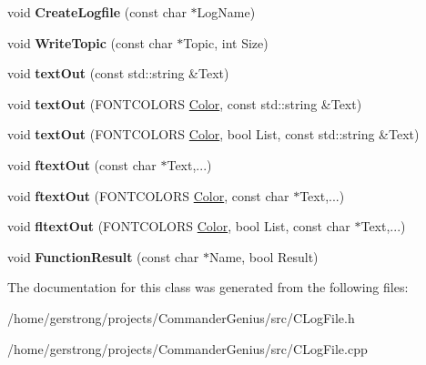 \begin{DoxyCompactItemize}
\item 
\hypertarget{class_c_log_file_a7a16cbbe6c76e8f862d506bf84c742c3}{
void {\bfseries CreateLogfile} (const char $\ast$LogName)}
\label{class_c_log_file_a7a16cbbe6c76e8f862d506bf84c742c3}

\item 
\hypertarget{class_c_log_file_a33046a6467f02fbc1219432d4c70e57d}{
void {\bfseries WriteTopic} (const char $\ast$Topic, int Size)}
\label{class_c_log_file_a33046a6467f02fbc1219432d4c70e57d}

\item 
\hypertarget{class_c_log_file_a1517a34e2c4a3cc99077101e77bd2266}{
void {\bfseries textOut} (const std::string \&Text)}
\label{class_c_log_file_a1517a34e2c4a3cc99077101e77bd2266}

\item 
\hypertarget{class_c_log_file_a56721cf83c549f35a9d7335836fa395c}{
void {\bfseries textOut} (FONTCOLORS \hyperlink{struct_color}{Color}, const std::string \&Text)}
\label{class_c_log_file_a56721cf83c549f35a9d7335836fa395c}

\item 
\hypertarget{class_c_log_file_aef92400b9e28bb7eb0ead7d30a9df8e1}{
void {\bfseries textOut} (FONTCOLORS \hyperlink{struct_color}{Color}, bool List, const std::string \&Text)}
\label{class_c_log_file_aef92400b9e28bb7eb0ead7d30a9df8e1}

\item 
\hypertarget{class_c_log_file_a5150a03b56ce66f17614d112a87a2f70}{
void {\bfseries ftextOut} (const char $\ast$Text,...)}
\label{class_c_log_file_a5150a03b56ce66f17614d112a87a2f70}

\item 
\hypertarget{class_c_log_file_a114f1ded85b870e60e248b3e43dade9d}{
void {\bfseries ftextOut} (FONTCOLORS \hyperlink{struct_color}{Color}, const char $\ast$Text,...)}
\label{class_c_log_file_a114f1ded85b870e60e248b3e43dade9d}

\item 
\hypertarget{class_c_log_file_a56223413813f6fca4994a2d7d835cca2}{
void {\bfseries fltextOut} (FONTCOLORS \hyperlink{struct_color}{Color}, bool List, const char $\ast$Text,...)}
\label{class_c_log_file_a56223413813f6fca4994a2d7d835cca2}

\item 
\hypertarget{class_c_log_file_a86a816444fef5d6e4697f0c5eeee3e17}{
void {\bfseries FunctionResult} (const char $\ast$Name, bool Result)}
\label{class_c_log_file_a86a816444fef5d6e4697f0c5eeee3e17}

\end{DoxyCompactItemize}


The documentation for this class was generated from the following files:\begin{DoxyCompactItemize}
\item 
/home/gerstrong/projects/CommanderGenius/src/CLogFile.h\item 
/home/gerstrong/projects/CommanderGenius/src/CLogFile.cpp\end{DoxyCompactItemize}
